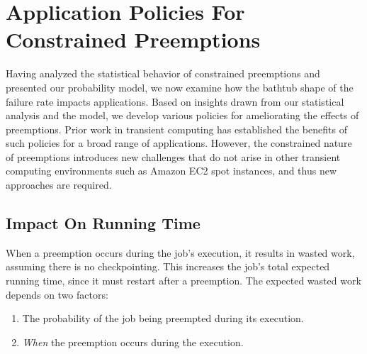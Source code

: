 
\section{Application Policies For Constrained Preemptions}
\label{sec:policies}
Having analyzed the statistical behavior of constrained preemptions and presented our probability model, we now examine how the bathtub shape of the failure rate impacts applications.
Based on insights drawn from our statistical analysis and the model, we develop various policies for ameliorating the effects of preemptions. 
Prior work in transient computing has established the benefits of such policies for a broad range of applications.
However, the constrained nature of preemptions introduces new challenges that do not arise in other transient computing environments such as Amazon EC2 spot instances, and thus new approaches are required.








\subsection{Impact On Running Time}

When a preemption occurs during the job's execution, it results in wasted work, assuming there is no checkpointing.
This increases the job's total expected running time, since it must restart after a preemption.
%
The expected wasted work depends on two factors:
\begin{enumerate} [leftmargin=12pt]
\item The probability of the job being preempted during its execution. 
\item \emph{When} the preemption occurs during the execution. 
\end{enumerate}

